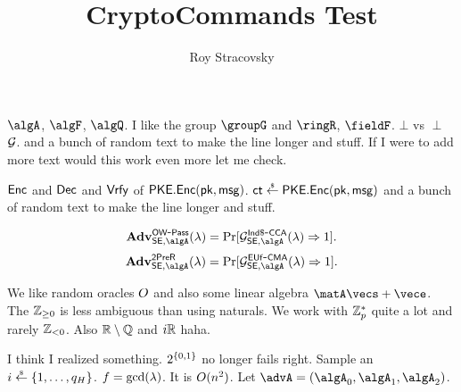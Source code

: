 \documentclass[11pt, oneside]{article}
\title{CryptoCommands Test}
\author{Roy Stracovsky}
\begin{document}
\maketitle

$\algA$, $\algF$, $\algQ$. I like the group $\groupG$ and $\ringR$, $\fieldF$. $\bot$ vs $\perp$
$\mathcal{G}$. and a bunch of random text to make the line longer and stuff. If I were to add more text would this work even more let me check.

$\mathsf{Enc}$ and $\mathsf{Dec}$ and $\mathsf{Vrfy}$ of $\mathsf{PKE}.\mathsf{Enc}(\mathsf{pk}, \mathsf{msg})$.
$\ct \sample \PKEncScheme.\PKEnc(\pk, \msg)$ and a bunch of random text to make the line longer and stuff.

$$ \Adv{\OWPass}{\SEncScheme, \algA}{\secpar} = \Pr[\game^\IndRCCA_{\SEncScheme, \algA}(\secpar) \outputs 1].$$
$$ \Adv{\SecPreimageRes}{\SEncScheme, \algA}{\secpar} = \Pr[\game^\EUfCMA_{\SEncScheme, \algA}(\secpar) \outputs 1].$$

We like random oracles $O$ and also some linear algebra $\matA\vecs + \vece$. The ${\mathbb{Z}_{\ge 0}}$ is less ambiguous than using naturals.
We work with ${\mathbb{Z}^\ast_{p}}$ quite a lot and rarely ${\mathbb{Z}_{< 0}}$. Also ${\mathbb{R} \setminus \mathbb{Q}}$ and ${i\mathbb{R}}$ haha.

I think I realized something. $2^{\{0, 1\}}$ no longer fails right.
Sample an $i \sample \Range{1}{q_H}$. $f = \gcd(\lambda)$. It is $O(n^2)$.
Let $\advA = (\algA_0, \algA_1, \algA_2)$.

  
\end{document}
